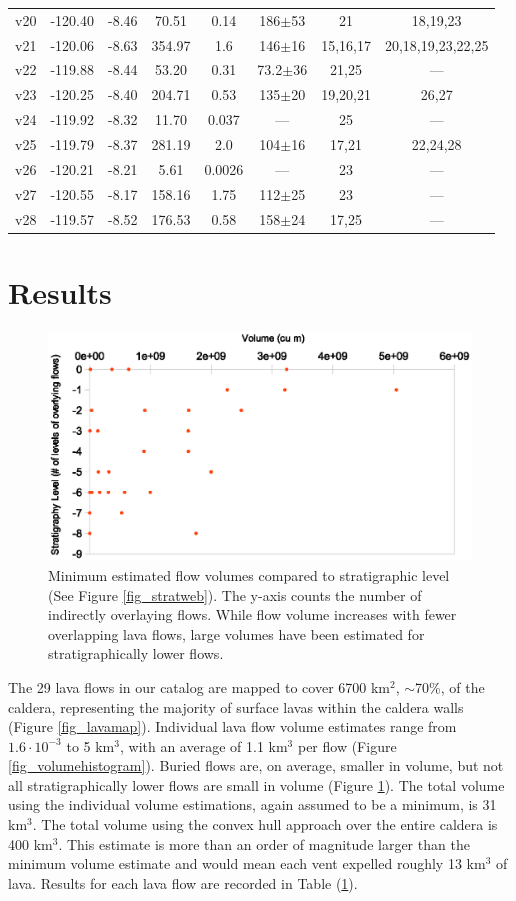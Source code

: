 \documentclass[12pt,letter]{article}
\begin{document}
\begin{table}[h!]
\begin{tabular}{l c c c c c c c}
			v20 & -120.40 & -8.46 & 70.51 & 0.14 & 186$\pm$53 & 21 & 18,19,23\\
			v21 & -120.06 & -8.63 & 354.97 & 1.6 & 146$\pm$16 & 15,16,17 & 20,18,19,23,22,25\\
			v22 & -119.88 & -8.44 & 53.20 & 0.31 & 73.2$\pm$36 & 21,25 & ---\\
			v23 & -120.25 & -8.40 & 204.71 & 0.53 & 135$\pm$20 & 19,20,21 & 26,27\\
			v24 & -119.92 & -8.32 & 11.70 & 0.037 & --- & 25 & ---\\
			v25 & -119.79 & -8.37 & 281.19 & 2.0 & 104$\pm$16 & 17,21 & 22,24,28\\
			v26 & -120.21 & -8.21 & 5.61 & 0.0026 & --- & 23 & ---\\
			v27 & -120.55 & -8.17 & 158.16 & 1.75 & 112$\pm$25 & 23 & ---\\
			v28 & -119.57 & -8.52 & 176.53 & 0.58 & 158$\pm$24 & 17,25 & ---\\
		\bottomrule
	\end{tabular}
	\label{tab_database}
	\end{table}


\section{Results}

\begin{figure}
\centering
\includegraphics[width=0.4\linewidth]{figures/volumeandstratigraphy}
\caption{Minimum estimated flow volumes compared to stratigraphic level (See Figure \ref{fig_stratweb}). The y-axis counts the number of indirectly overlaying flows. While flow volume increases with fewer overlapping lava flows, large volumes have been estimated for stratigraphically lower flows.}
\label{fig_volumeandstrat}
\end{figure}

The 29 lava flows in our catalog are mapped to cover 6700 km$^2$, $\sim$70\%, of the caldera, representing the majority of surface lavas within the caldera walls (Figure \ref{fig_lavamap}). Individual lava flow volume estimates range from $1.6\cdot 10^{-3}$ to 5 km$^3$, with an average of 1.1 km$^3$ per flow (Figure \ref{fig_volumehistogram}). Buried flows are, on average, smaller in volume, but not all stratigraphically lower flows are small in volume (Figure \ref{fig_volumeandstrat}). The total volume using the individual volume estimations, again assumed to be a minimum, is 31 km$^3$. The total volume using the convex hull approach over the entire caldera is 400 km$^3$. This estimate is more than an order of magnitude larger than the minimum volume estimate and would mean each vent expelled roughly 13 km$^3$ of lava. Results for each lava flow are recorded in Table (\ref{tab_database}).
\end{document}
